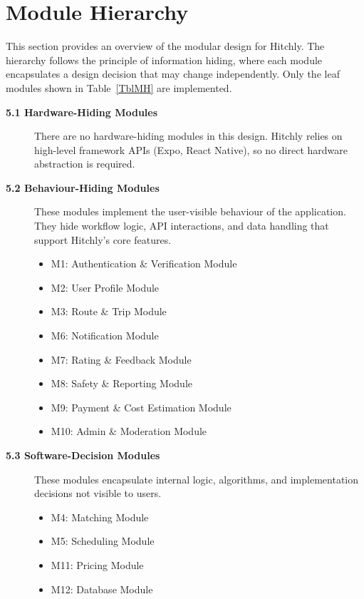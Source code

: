 \section{Module Hierarchy} \label{SecMH}

This section provides an overview of the modular design for Hitchly.  
The hierarchy follows the principle of information hiding, where each module  
encapsulates a design decision that may change independently.  
Only the leaf modules shown in Table~\ref{TblMH} are implemented.

\begin{description}

\item[\textbf{5.1 Hardware-Hiding Modules}]  
There are no hardware-hiding modules in this design.  
Hitchly relies on high-level framework APIs (Expo, React Native),  
so no direct hardware abstraction is required.

\item[\textbf{5.2 Behaviour-Hiding Modules}]  
These modules implement the user-visible behaviour of the application.  
They hide workflow logic, API interactions, and data handling that support 
Hitchly’s core features.

\begin{itemize}
  \item M1: Authentication \& Verification Module
  \item M2: User Profile Module
  \item M3: Route \& Trip Module
  \item M6: Notification Module
  \item M7: Rating \& Feedback Module
  \item M8: Safety \& Reporting Module
  \item M9: Payment \& Cost Estimation Module
  \item M10: Admin \& Moderation Module
\end{itemize}

\item[\textbf{5.3 Software-Decision Modules}]  
These modules encapsulate internal logic, algorithms,  
and implementation decisions not visible to users.

\begin{itemize}
  \item M4: Matching Module
  \item M5: Scheduling Module
  \item M11: Pricing Module
  \item M12: Database Module
\end{itemize}

\end{description}

